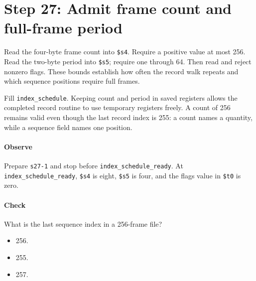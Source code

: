 \section{Step 27: Admit frame count and full-frame period}
Read the four-byte frame count into \texttt{\$s4}. Require a positive value
at most 256. Read the two-byte period into \texttt{\$s5}; require one through
64. Then read and reject nonzero flags. These bounds establish how often the
record walk repeats and which sequence positions require full frames.

Fill \texttt{index\_schedule}. Keeping count and period in saved registers
allows the completed record routine to use temporary registers freely. A count
of 256 remains valid even though the last record index is 255: a count names a
quantity, while a sequence field names one position.

\paragraph{Observe} Prepare \texttt{s27-1} and stop before
\texttt{index\_schedule\_ready}. At \texttt{index\_schedule\_ready}, \texttt{\$s4} is eight,
\texttt{\$s5} is four, and the flags value in \texttt{\$t0} is zero.

\paragraph{Check} What is the last sequence index in a 256-frame file?
\begin{itemize}
\item[A.] 256.
\item[B.] 255.
\item[C.] 257.
\end{itemize}

